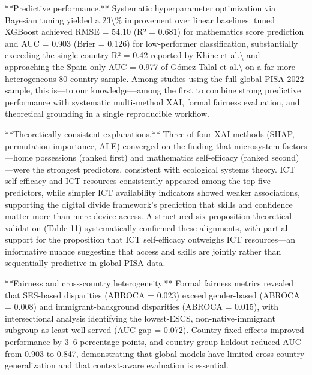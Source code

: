 \documentclass[pdflatex,sn-mathphys-ay]{sn-jnl}
\begin{document}
**Predictive performance.** Systematic hyperparameter optimization via Bayesian tuning yielded a 23\textbackslash{}\% improvement over linear baselines: tuned XGBoost achieved RMSE = 54.10 (R² = 0.681) for mathematics score prediction and AUC = 0.903 (Brier = 0.126) for low-performer classification, substantially exceeding the single-country R² = 0.42 reported by Khine et al.\textbackslash{} \citep{Khine_2024} and approaching the Spain-only AUC = 0.977 of Gómez-Talal et al.\textbackslash{} \citep{Gomez_Talal_2025_ieee} on a far more heterogeneous 80-country sample. Among studies using the full global PISA 2022 sample, this is---to our knowledge---among the first to combine strong predictive performance with systematic multi-method XAI, formal fairness evaluation, and theoretical grounding in a single reproducible workflow.

**Theoretically consistent explanations.** Three of four XAI methods (SHAP, permutation importance, ALE) converged on the finding that microsystem factors---home possessions (ranked first) and mathematics self-efficacy (ranked second)---were the strongest predictors, consistent with ecological systems theory. ICT self-efficacy and ICT resources consistently appeared among the top five predictors, while simpler ICT availability indicators showed weaker associations, supporting the digital divide framework's prediction that skills and confidence matter more than mere device access. A structured six-proposition theoretical validation (Table 11) systematically confirmed these alignments, with partial support for the proposition that ICT self-efficacy outweighs ICT resources---an informative nuance suggesting that access and skills are jointly rather than sequentially predictive in global PISA data.

**Fairness and cross-country heterogeneity.** Formal fairness metrics revealed that SES-based disparities (ABROCA = 0.023) exceed gender-based (ABROCA = 0.008) and immigrant-background disparities (ABROCA = 0.015), with intersectional analysis identifying the lowest-ESCS, non-native-immigrant subgroup as least well served (AUC gap = 0.072). Country fixed effects improved performance by 3--6 percentage points, and country-group holdout reduced AUC from 0.903 to 0.847, demonstrating that global models have limited cross-country generalization and that context-aware evaluation is essential.
\end{document}

